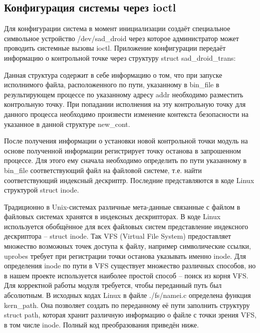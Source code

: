 \subsection{Конфигурация системы через ioctl}

Для конфигурации система в момент инициализации создаёт специальное
символьное устройство /dev/sad\_droid через которое администратор может
проводить системные вызовы ioctl. Приложение конфигурации передаёт
информацию о контрольной точке через структуру struct sad\_droid\_trans:


\bigskip

Данная структура содержит в себе информацию о том, что при запуске
исполнимого файла, расположенного по пути, указанному в bin\_file в
результирующем процессе по указанному адресу addr необходимо разместить
контрольную точку. При попадании исполнения на эту контрольную точку для
данного процесса необходимо произвести изменение контекста безопасности
на указанное в данной структуре new\_cont.

После получения информации о установки новой контрольной точки модуль на
основе полученной информации регистрирует точку останова в запрошенном
процессе. Для этого ему сначала необходимо определить по пути указанному
в bin\_file соответствующий файл на файловой системе, т.е. найти
соответствующий индексный дескриптр. Последние представляются в коде
Linux структурой struct inode. 

Традиционно в Unix-системах различные мета-данные связанные с файлом в
файловых системах хранятся в индексных дескрипторах. В коде Linux
используется обобщённое для всех файловых систем представление
индексного дескриптора -- struct inode. Так VFS (Virtual File System)
предоставляет множество возможных точек доступа к файлу, например
символические ссылки, uprobes требует при регистрации точки останова
указывать именно inode. Для определения inode по пути в VFS существует
множество различных способов, но в нашем проекте используется наиболее
простой способ -- поиск из корня VFS. Для корректной работы модуля
требуется, чтобы переданный путь был абсолютным. В исходных кодах Linux
в файле ./fs/namei.c определена функция kern\_path. Она позволяет
создать по переданному её пути заполнить структуру struct path, которая
хранит различную информацию о файле с точки зрения VFS, в том числе
inode. Полный код преобразования приведён ниже.


\bigskip

